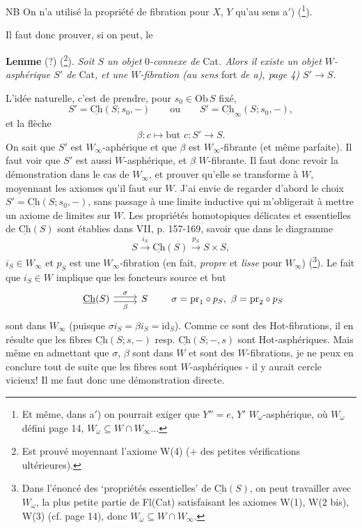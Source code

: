 \documentclass[11pt]{article}
\newcommand{\msp}[1]{\marginpar{\footnotesize [#1]}}
\newcommand{\Ch}{\underline{\mathrm{Ch}}}
\begin{document}
NB On n'a utilisé la propriété de fibration pour $X$, $Y$ qu'au sens a$'$) (\footnote[10]{Et même, dans a$'$) on pourrait exiger que $Y'' = e$, $Y'$ $W_\omega$-asphérique, où $W_\omega$ défini page 14, $W_\omega \subseteq W \cap W_\infty \ldots$}).

Il faut donc prouver, si on peut, le

\textbf{Lemme} (?) (\footnote[11]{Est prouvé moyennant l'axiome W(4) (+ des petites vérifications ultérieures).}). \textit{Soit $S$ un objet} $0$\textit{-connexe de} Cat\textit{. Alors il existe un objet $W$-asphérique $S'$ de} Cat\textit{, et une $W$-fibration (au sens} fort \textit{de a), page 4) $S' \longrightarrow S$.}

L'idée naturelle, c'est de prendre, pour $s_0 \in \mathrm{Ob}\,S$ fixé,
\[ S' = \Ch(S; s_0, -) \qquad \text{ou} \qquad S' = \Ch_\infty(S; s_0, -), \]
et la flèche
\[ \beta : c \longmapsto \text{but } c : S' \longrightarrow S. \]
On sait que $S'$ est $W_\infty$-aphérique et que $\beta$ est $W_\infty$-fibrante (et même parfaite). Il faut voir que $S'$ est aussi $W$-asphérique, et $\beta$ $W$-fibrante. Il faut donc revoir la démonstration dans le cas de $W_\infty$, et prouver qu'elle se transforme à $W$, %
\msp{page 8}
moyennant les axiomes qu'il faut sur $W$. J'ai envie de regarder d'abord le choix $S' = \Ch(S; s_0, -)$, sans passage à une limite inductive qui m'obligerait à mettre un axiome de limites sur $W$. Les propriétés homotopiques délicates et essentielles de $\Ch(S)$ sont établies dans VII, p. 157-169, savoir que dans le diagramme
\[ S \xrightarrow{i_S} \Ch(S) \xrightarrow{p_S} S \times S, \]
$i_S \in W_\infty$ et $p_S$ est une $W_\infty$-fibration (en fait, \textit{propre} et \textit{lisse} pour $W_\infty$) (\footnote[12]{Dans l'énoncé des ‘propriétés essentielles’ de $\Ch(S)$, on peut travailler avec $W_\omega$, la plus petite partie de Fl(Cat) satisfaisant les axiomes W(1), W(2 bis), W(3) (cf. page 14), donc $W_\omega \subseteq W \cap W_\infty$.}). Le fait que $i_S \in W$ implique que les foncteurs source et but
\[ \begin{tikzcd} \Ch(S) \arrow[r, shift left, "\sigma"] \arrow[r, shift right, "\beta"'] & S \end{tikzcd} \qquad \sigma = \mathrm{pr}_1 \circ p_S,\ \beta = \mathrm{pr}_2 \circ p_S \]
sont dans $W_\infty$ (puisque $\sigma i_S = \beta i_S = \mathrm{id}_S$). Comme ce sont des Hot-fibrations, il en résulte que les fibres $\Ch(S; s, -)$ resp. $\Ch(S; -, s)$ sont Hot-asphériques. Mais même en admettant que $\sigma$, $\beta$ sont dans $W$ et sont des $W$-fibrations, je ne peux en conclure tout de suite que les fibres sont $W$-asphériques - il y aurait cercle vicieux! Il me faut donc une démonstration directe.
\end{document}
